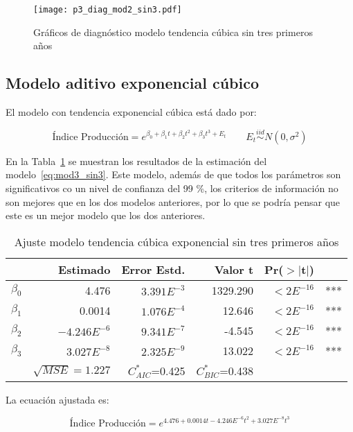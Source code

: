 \documentclass{tufte-handout}
\begin{document}
\begin{figure*}[!ht]
    \texttt{[image: p3\_diag\_mod2\_sin3.pdf]}
    \caption{Gráficos de diagnóstico modelo tendencia cúbica sin tres primeros años}
    \label{fig:p3_diag_mod2_sin3.pdf}
\end{figure*}

\subsection*{Modelo aditivo exponencial cúbico}

El modelo con tendencia exponencial cúbica está dado por:

\begin{equation} \label{eq:mod3_sin3}
	\text{Índice Producción} = e^{\beta_0 + \beta_1 t + \beta_2 t^2 + \beta_3 t^3 + E_t}
	\qquad E_t \stackrel{iid}{\sim} N(0, \sigma^2)
\end{equation}

En la Tabla~\ref{tab:mod3_sin3} se muestran los resultados de la estimación del modelo~\ref{eq:mod3_sin3}. Este modelo, además de que todos los parámetros son significativos co un nivel de confianza del 99 \%, los criterios de información no son mejores que en los dos modelos anteriores, por lo que se podría pensar que este es un mejor modelo que los dos anteriores.

\begin{table}[ht]
\centering
\begin{tabular}{lrrrrl}
          & Estimado & Error Estd. & Valor t & Pr($>$$|$t$|$) & \\ 
  \hline
$\beta_0$ & 4.476 & $3.391E^{-3}$ & 1329.290 & $<2E^{-16}$ & *** \\ 
  $\beta_1$ & 0.0014 & $1.076E^{-4}$ & 12.646 & $<2E^{-16}$ & *** \\ 
  $\beta_2$ & $-4.246E^{-6}$ & $9.341E^{-7}$ & -4.545 & $<2E^{-16}$ & *** \\ 
  $\beta_3$ & $3.027E^{-8}$ & $2.325E^{-9}$ & 13.022 & $<2E^{-16}$ & *** \\ 
   \hline
   & $\sqrt{MSE}=1.227$ & $C^{*}_{AIC}$=0.425 & $C^{*}_{BIC}$=0.438 & \\
   \hline
\end{tabular}
\caption{Ajuste modelo tendencia cúbica exponencial sin tres primeros años} 
\label{tab:mod3_sin3}
\end{table}

La ecuación ajustada es:

\begin{equation}
	\text{Índice Producción} = e^{4.476 + 0.0014 t - 4.246E^{-6} t^2 + 3.027E^{-8} t^3}
\end{equation}
\end{document}
